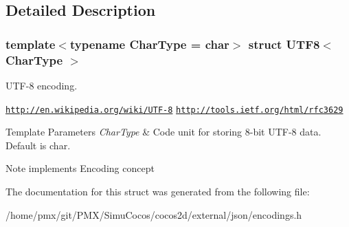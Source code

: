 \subsection{Detailed Description}
\subsubsection*{template$<$typename Char\+Type = char$>$\newline
struct U\+T\+F8$<$ Char\+Type $>$}

U\+T\+F-\/8 encoding. 

\href{http://en.wikipedia.org/wiki/UTF-8}{\tt http\+://en.\+wikipedia.\+org/wiki/\+U\+T\+F-\/8} \href{http://tools.ietf.org/html/rfc3629}{\tt http\+://tools.\+ietf.\+org/html/rfc3629} 
\begin{DoxyTemplParams}{Template Parameters}
{\em Char\+Type} & Code unit for storing 8-\/bit U\+T\+F-\/8 data. Default is char. \\
\hline
\end{DoxyTemplParams}
\begin{DoxyNote}{Note}
implements Encoding concept 
\end{DoxyNote}


The documentation for this struct was generated from the following file\+:\begin{DoxyCompactItemize}
\item 
/home/pmx/git/\+P\+M\+X/\+Simu\+Cocos/cocos2d/external/json/encodings.\+h\end{DoxyCompactItemize}
